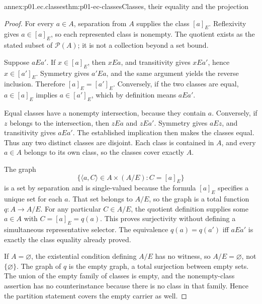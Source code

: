 \begin{annexitem}{annex:p01.ec.classes}{thm:p01-ec-classes}{Classes, their equality and the projection}
\begin{proof}
For every \(a\in A\), separation from \(A\) supplies the class
\([a]_E\). Reflexivity gives \(a\in[a]_E\), so each represented
class is nonempty. The quotient exists as the stated subset of
\(\mathcal P(A)\); it is not a collection beyond a set bound.

Suppose \(aEa'\). If \(x\in[a]_E\), then \(xEa\), and
transitivity gives \(xEa'\), hence \(x\in[a']_E\).
Symmetry gives \(a'Ea\), and the same argument yields the reverse
inclusion. Therefore \([a]_E=[a']_E\). Conversely, if the two
classes are equal, \(a\in[a]_E\) implies \(a\in[a']_E\),
which by definition means \(aEa'\).

Equal classes have a nonempty intersection, because they contain
\(a\). Conversely, if \(z\) belongs to the intersection, then
\(zEa\) and \(zEa'\). Symmetry gives \(aEz\), and transitivity
gives \(aEa'\). The established implication then makes the classes
equal. Thus any two distinct classes are disjoint. Each class is
contained in \(A\), and every \(a\in A\) belongs to its own
class, so the classes cover exactly \(A\).

The graph
\[
 \{\langle a,C\rangle\in A\times(A/E):C=[a]_E\}
\]
is a set by separation and is single-valued because the formula
\([a]_E\) specifies a unique set for each \(a\). That set belongs
to \(A/E\), so the graph is a total function \(q:A\to A/E\).
For any particular \(C\in A/E\), the quotient definition supplies
some \(a\in A\) with \(C=[a]_E=q(a)\). This proves
surjectivity without defining a simultaneous representative selector.
The equivalence \(q(a)=q(a')\) iff \(aEa'\) is exactly the class
equality already proved.

If \(A=\varnothing\), the existential condition defining \(A/E\)
has no witness, so \(A/E=\varnothing\), not \(\{\varnothing\}\).
The graph of \(q\) is the empty graph, a total surjection between
empty sets. The union of the empty family of classes is empty, and
the nonempty-class assertion has no counterinstance because there
is no class in that family. Hence the partition statement covers
the empty carrier as well.
\end{proof}
\end{annexitem}


